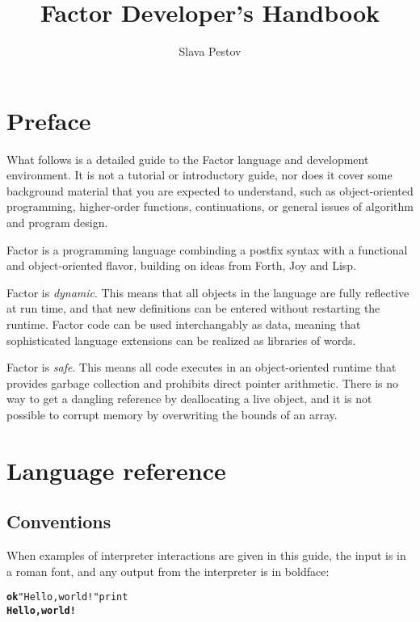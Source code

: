 \documentclass{book}
\begin{document}
\title{Factor Developer's Handbook}

\author{Slava Pestov}

\maketitle
\tableofcontents{}

\chapter*{Preface}

What follows is a detailed guide to the Factor language and development environment. It is not a tutorial or introductory guide, nor does it cover some background material that you are expected to understand, such as object-oriented programming, higher-order functions, continuations, or general issues of algorithm and program design.

Factor is a programming language combinding a postfix syntax with a functional and object-oriented
flavor, building on ideas from Forth, Joy and Lisp.

Factor is \emph{dynamic}. This means that all objects in the language are fully reflective at run time, and that new definitions can be entered without restarting the runtime. Factor code can be used interchangably as data, meaning that sophisticated language extensions can be realized as libraries of words.

Factor is \emph{safe}. This means all code executes in an object-oriented runtime that provides
garbage collection and prohibits direct pointer arithmetic. There is no way to get a dangling reference by deallocating a live object, and it is not possible to corrupt memory by overwriting the bounds of an array.

\chapter{Language reference}

\section{Conventions}

When examples of interpreter interactions are given in this guide, the input is in a roman font, and any
output from the interpreter is in boldface:
\begin{alltt}
\textbf{ok} "Hello, world!" print
\textbf{Hello, world!}
\end{alltt}
\end{document}
